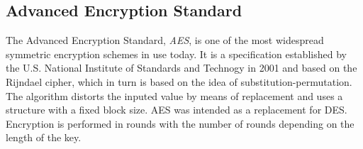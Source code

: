 \subsection{Advanced Encryption Standard}

The Advanced Encryption Standard\cite{AES:2001}, \emph{AES}, is one of the most widespread symmetric encryption schemes in use today. It is a specification established by the U.S. National Institute of Standards and Technogy in 2001 and based on the Rijndael cipher\cite{Rijndael:Online}, which in turn is based on the idea of substitution-permutation\cite{AESISFAST:Online}. The algorithm distorts the inputed value by means of replacement and uses a structure with a fixed block size. AES was intended as a replacement for DES\cite{DES:1977}\cite{Cisco:2001}. Encryption is performed in rounds with the number of rounds depending on the length of the key. 

